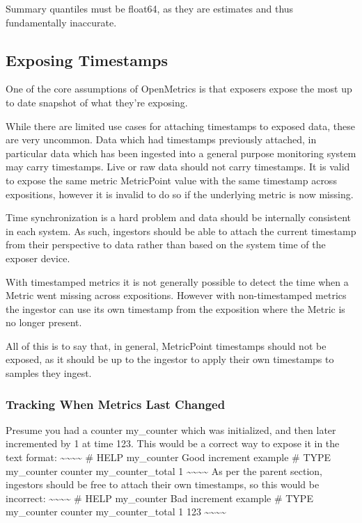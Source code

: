 \documentclass[a4paper,12pt,notitlepage,twoside,openright]{article}
\begin{document}
Summary quantiles must be float64, as they are estimates and thus
fundamentally inaccurate.

\hypertarget{exposing-timestamps}{%
\subsection{Exposing Timestamps}\label{exposing-timestamps}}

One of the core assumptions of OpenMetrics is that exposers expose the
most up to date snapshot of what they're exposing.

While there are limited use cases for attaching timestamps to exposed
data, these are very uncommon. Data which had timestamps previously
attached, in particular data which has been ingested into a general
purpose monitoring system may carry timestamps. Live or raw data should
not carry timestamps. It is valid to expose the same metric MetricPoint
value with the same timestamp across expositions, however it is invalid
to do so if the underlying metric is now missing.

Time synchronization is a hard problem and data should be internally
consistent in each system. As such, ingestors should be able to attach
the current timestamp from their perspective to data rather than based
on the system time of the exposer device.

With timestamped metrics it is not generally possible to detect the time
when a Metric went missing across expositions. However with
non-timestamped metrics the ingestor can use its own timestamp from the
exposition where the Metric is no longer present.

All of this is to say that, in general, MetricPoint timestamps should
not be exposed, as it should be up to the ingestor to apply their own
timestamps to samples they ingest.

\hypertarget{tracking-when-metrics-last-changed}{%
\subsubsection{Tracking When Metrics Last
Changed}\label{tracking-when-metrics-last-changed}}

Presume you had a counter my\_counter which was initialized, and then
later incremented by 1 at time 123. This would be a correct way to
expose it in the text format:
\textasciitilde\textasciitilde\textasciitilde\textasciitilde{} \# HELP
my\_counter Good increment example \# TYPE my\_counter counter
my\_counter\_total 1
\textasciitilde\textasciitilde\textasciitilde\textasciitilde{} As per
the parent section, ingestors should be free to attach their own
timestamps, so this would be incorrect:
\textasciitilde\textasciitilde\textasciitilde\textasciitilde{} \# HELP
my\_counter Bad increment example \# TYPE my\_counter counter
my\_counter\_total 1 123
\textasciitilde\textasciitilde\textasciitilde\textasciitilde{}
\end{document}
